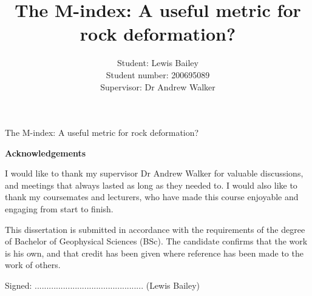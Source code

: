 \documentclass[a4paper,12pt,twoside]{report}
\title{\textbf{The M-index: A useful metric for rock deformation?}}
\author{Student: Lewis Bailey\\Student number: 200695089\\Supervisor: Dr Andrew Walker}
\date{}
\numberwithin{equation}{chapter}
\begin{document}

%
%
%
%
%
%


\vspace{3cm}
\begin{center}
{\huge The M-index: A useful metric for rock deformation?}
\vspace{3cm}

\begin{Large}
\textbf{Acknowledgements}
\end{Large}

I would like to thank my supervisor Dr Andrew Walker for valuable discussions, and meetings that always lasted as long as they needed to. I would also like to thank my coursemates and lecturers, who have made this course enjoyable and engaging from start to finish.
  
\vspace{3cm}
\noindent
\begin{Large}
\end{Large}

This dissertation is submitted in accordance with the requirements of the degree of Bachelor of Geophysical Sciences (BSc). The candidate confirms that the work is his own, and that credit has been given where reference has been made to the work of others. 


\vspace{1cm}
\noindent
Signed: .............................................. (Lewis Bailey)

\end{center}
\end{document}

